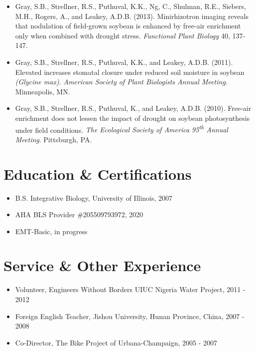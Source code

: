 \documentclass[letterpaper]{article}
\begin{document}
  \begin{itemize}

    \item Gray, S.B., Strellner, R.S., Puthuval, K.K., Ng, C., Shulman, R.E., Siebers, M.H., Rogers, A., and Leakey, A.D.B. (2013). Minirhizotron imaging reveals that nodulation of field-grown soybean is enhanced by free-air  enrichment only when combined with drought stress. {\it Functional Plant Biology} 40, 137-147.
    \item Gray, S.B., Strellner, R.S., Puthuval, K.K., and Leakey, A.D.B. (2011). Elevated  increases stomatal closure under reduced soil moisture in soybean {\it(Glycine max)}. {\it American Society of Plant Biologists Annual Meeting}. Minneapolis, MN.
    \item Gray, S.B., Strellner, R.S., Puthuval, K., and Leakey, A.D.B. (2010). Free-air  enrichment does not lessen the impact of drought on soybean photosynthesis under field conditions. {\it The Ecological Society of America 95\textsuperscript{th} Annual Meeting}. Pittsburgh, PA.

  \end{itemize}

\section*{Education \& Certifications}

  \begin{itemize}
    \item B.S. Integrative Biology, University of Illinois, 2007
    \item AHA BLS Provider \#205509793972, 2020
    \item EMT-Basic, in progress
  \end{itemize}

\section*{Service \& Other Experience}

  \begin{itemize}
      \item Volunteer, Engineers Without Borders UIUC Nigeria Water Project, 2011 - 2012
      \item Foreign English Teacher, Jishou University, Hunan Province, China, 2007 - 2008
      \item Co-Director, The Bike Project of Urbana-Champaign, 2005 - 2007
  \end{itemize}
\end{document}
